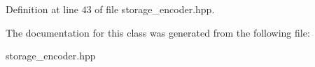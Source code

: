 Definition at line 43 of file storage\-\_\-encoder.\-hpp.



The documentation for this class was generated from the following file\-:\begin{DoxyCompactItemize}
\item 
storage\-\_\-encoder.\-hpp\end{DoxyCompactItemize}
